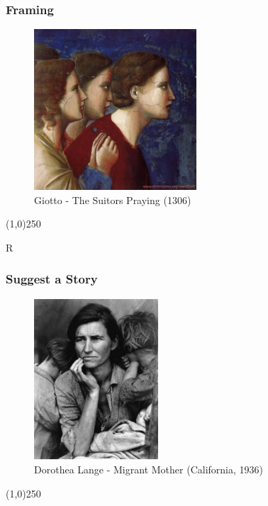 \begin{frame}
\frametitle{Framing}
\begin{figure}
	\centering
	\includegraphics[height=6cm]{img/CandC/giotto3a}
	\caption{Giotto - The Suitors Praying (1306)}
	\label{fig:giotto3a}
\end{figure}
\end{frame}
\begin{center}\line(1,0){250}\end{center}R





\begin{frame}
\frametitle{Suggest a Story}
\begin{figure}
	\centering
		\includegraphics[height=6cm]{img/candc/DorethaLange.jpg}
	\caption{Dorothea Lange - Migrant Mother (California, 1936)}
	\label{fig:DorotheaLangeMigrantMother}
\end{figure}
\end{frame}
\begin{center}\line(1,0){250}\end{center}


